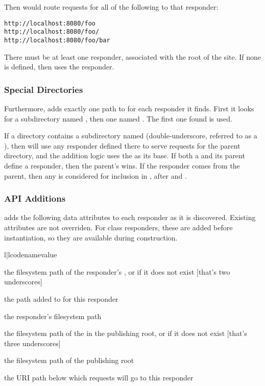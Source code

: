 Then  would route requests for all of the following to that
responder:

\begin{verbatim}
http://localhost:8080/foo
http://localhost:8080/foo/
http://localhost:8080/foo/bar
\end{verbatim}

There must be at least one responder, associated with the root of the site. If
none is defined, then  uses the  responder.


\subsubsection{Special Directories}

Furthermore,  adds exactly one path to  for
each responder it finds. First it looks for a subdirectory named
, then one named . The first one found is used.

If a directory contains a subdirectory named \file{__} (double-underscore,
referred to as a ), then  will use any
responder defined there to serve requests for the parent directory, and the
 addition logic uses the  as its base. If
both a  and its parent define a responder, then the
parent's wins. If the responder comes from the parent, then any  is considered for inclusion in , after
 and .


\subsubsection{API Additions}

 adds the following data attributes to each responder as it is
discovered. Existing attributes are not overriden. For class responders, these
are added before instantiation, so they are available during construction.

\begin{tableii}{l|l}{code}{name}{value}

\lineii{__}
    {the filesystem path of the responder's , or
     if it does not exist [that's two underscores]}

    {the path added to  for this responder}

    {the responder's filesystem path}

    {the filesystem path of the  in the publishing root,
    or  if it does not exist [that's three underscores]}

    {the filesystem path of the publishing root}

    {the URI path below which requests will go to this responder}

\end{tableii}




